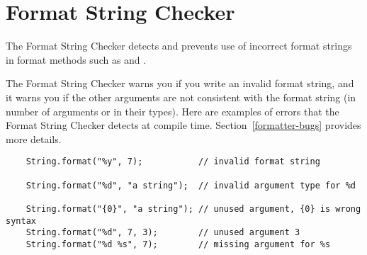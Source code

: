 \htmlhr
\chapter{Format String Checker\label{formatter-checker}}

The Format String Checker detects and prevents use of incorrect format strings
in format methods such as 
and .

The Format String Checker warns you if you write an invalid format string,
and it warns you if the other arguments are not consistent with the format
string (in number of arguments or in their types).  Here are examples of
errors that the Format String Checker detects at compile time.
Section~\ref{formatter-bugs} provides more details.



% 
%

\begin{Verbatim}
    String.format("%y", 7);           // invalid format string

    String.format("%d", "a string");  // invalid argument type for %d

    String.format("{0}", "a string"); // unused argument, {0} is wrong syntax
    String.format("%d", 7, 3);        // unused argument 3
    String.format("%d %s", 7);        // missing argument for %s
\end{Verbatim}

